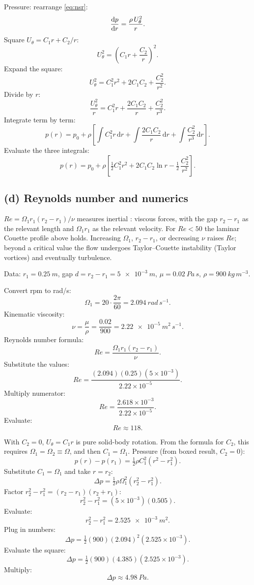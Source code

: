 \documentclass[11pt]{article}
\newcommand{\de}{\mathrm{d}}
\begin{document}
Pressure: rearrange \eqref{eq:nsr}:
\[ \dv{p}{r} = \frac{\rho\,U_\theta^2}{r}. \]
Square $U_\theta = C_1 r + C_2/r$:
\[ U_\theta^2 = \left(C_1 r + \frac{C_2}{r}\right)^{\!2}. \]
Expand the square:
\[ U_\theta^2 = C_1^2 r^2 + 2 C_1 C_2 + \frac{C_2^2}{r^2}. \]
Divide by $r$:
\[ \frac{U_\theta^2}{r} = C_1^2 r + \frac{2C_1 C_2}{r} + \frac{C_2^2}{r^3}. \]
Integrate term by term:
\[ p(r) = p_0 + \rho\!\left[\int C_1^2 r\,\de r + \int\frac{2C_1 C_2}{r}\,\de r + \int\frac{C_2^2}{r^3}\,\de r\right]. \]
Evaluate the three integrals:
\[ \boxed{\;p(r) = p_0 + \rho\!\left[\tfrac12 C_1^2 r^2 + 2 C_1 C_2 \ln r - \tfrac12\,\frac{C_2^2}{r^2}\right].\;} \]

\subsection*{(d) Reynolds number and numerics}

$Re=\Omega_1 r_1(r_2-r_1)/\nu$ measures inertial : viscous forces, with the gap $r_2-r_1$ as the relevant length and $\Omega_1 r_1$ as the relevant velocity. For $Re<50$ the laminar Couette profile above holds. Increasing $\Omega_1$, $r_2-r_1$, or decreasing $\nu$ raises $Re$; beyond a critical value the flow undergoes Taylor--Couette instability (Taylor vortices) and eventually turbulence.

Data: $r_1 = \SI{0.25}{m}$, gap $d = r_2-r_1 = \SI{5e-3}{m}$, $\mu = \SI{0.02}{Pa\,s}$, $\rho = \SI{900}{kg\,m^{-3}}$.

Convert rpm to rad/s:
\[ \Omega_1 = 20\cdot\frac{2\pi}{60} = \SI{2.094}{rad\,s^{-1}}. \]
Kinematic viscosity:
\[ \nu = \frac{\mu}{\rho} = \frac{0.02}{900} = \SI{2.22e-5}{m^2\,s^{-1}}. \]
Reynolds number formula:
\[ Re = \frac{\Omega_1 r_1(r_2-r_1)}{\nu}. \]
Substitute the values:
\[ Re = \frac{(2.094)(0.25)(5\times 10^{-3})}{2.22\times 10^{-5}}. \]
Multiply numerator:
\[ Re = \frac{2.618\times 10^{-3}}{2.22\times 10^{-5}}. \]
Evaluate:
\[ \boxed{\;Re \approx 118.\;} \]

With $C_2=0$, $U_\theta = C_1 r$ is pure solid-body rotation. From the formula for $C_2$, this requires $\Omega_1=\Omega_2\equiv\Omega$, and then $C_1 = \Omega_1$. Pressure (from boxed result, $C_2=0$):
\[ p(r) - p(r_1) = \tfrac12 \rho C_1^2 (r^2 - r_1^2). \]
Substitute $C_1 = \Omega_1$ and take $r=r_2$:
\[ \Delta p = \tfrac12\rho\Omega_1^2 (r_2^2 - r_1^2). \]
Factor $r_2^2 - r_1^2 = (r_2-r_1)(r_2+r_1)$:
\[ r_2^2 - r_1^2 = (5\times 10^{-3})(0.505). \]
Evaluate:
\[ r_2^2 - r_1^2 = \SI{2.525e-3}{m^2}. \]
Plug in numbers:
\[ \Delta p = \tfrac12 (900)(2.094)^2(2.525\times 10^{-3}). \]
Evaluate the square:
\[ \Delta p = \tfrac12 (900)(4.385)(2.525\times 10^{-3}). \]
Multiply:
\[ \boxed{\;\Delta p \approx \SI{4.98}{Pa}.\;} \]
\end{document}
